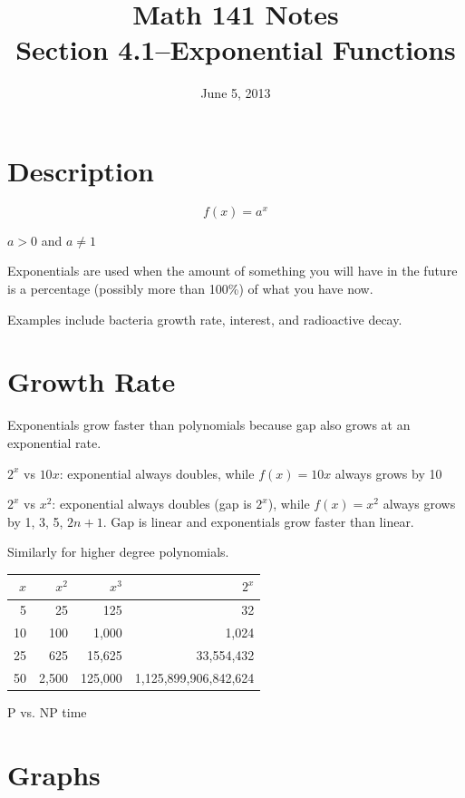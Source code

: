 \documentclass{exam}
\title{Math 141 Notes \\ Section 4.1--Exponential Functions}
\date{June 5, 2013}
\begin{document}
  \maketitle
  \tableofcontents

  \section{Description}

  \[
    f(x) = a^x
  \]

    $a > 0$ and $a \neq 1$

  Exponentials are used when the amount of something you will have in the future is a percentage (possibly more than
  100\%) of what you have now.  
  
  Examples include bacteria growth rate, interest, and radioactive decay.

  \section{Growth Rate}
  Exponentials grow faster than polynomials because gap also grows at an exponential rate.

  \begin{itemize*}
    \item $2^x$ vs $10x$: exponential always doubles, while $f(x) = 10x$ always grows by 10
    \item $2^x$ vs $x^2$: exponential always doubles (gap is $2^x$), while $f(x) = x^2$ always grows by 1, 3, 5, $2n +
      1$.  Gap is linear and exponentials grow faster than linear.
    \item Similarly for higher degree polynomials.
  \end{itemize*}

  \begin{tabular}[h]{rrrr}
    \toprule
    $x$ & $x^2$ & $x^3$ & $2^x$ \\
    \midrule
    5  & 25    & 125     & 32 \\
    10 & 100   & 1,000   & 1,024 \\
    25 & 625   & 15,625  & 33,554,432 \\
    50 & 2,500 & 125,000 & 1,125,899,906,842,624 \\
    \bottomrule
  \end{tabular}

  P vs. NP time

  \section{Graphs}
\end{document}
